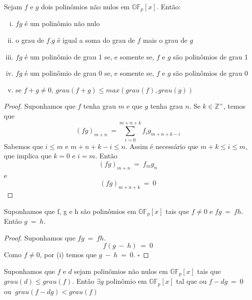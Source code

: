 
\begin{theorem}
Sejam $f$ e $g$ dois polinômios não nulos em $\mathbb{GF}_p[x]$. Então:
  \begin{enumerate}[(i)]
     \item $fg$ é um polinômio não nulo
     \item o grau de $f.g$ é igual a soma do grau de $f$ mais o grau de $g$
     \item $fg$ é um polinômio de grau 1 se, e somente se, $f$ e $g$ são polinômios de grau 1
     \item $fg$ é um polinômio de grau 0 se, e somente se, $f$ e $g$ são polinômios de grau 0
     \item se $f+g \neq 0$, $grau(f+g) \leq max (grau(f), grau(g))$
  \end{enumerate}
\end{theorem}

\begin{proof}
Suponhamos que $f$ tenha grau $m$ e que $g$ tenha grau $n$. Se $k \in \mathbb{Z}^+$, temos que
$$
(fg)_{m+n}\ = \displaystyle\sum_{i=0}^{m+n+k} f_i g_{m+n+k-i}
$$
Sabemos que $i \leq m$ e $m+n+k-i \leq n$. Assim é necessário que $m+k \leq i \leq m$, que implica que $k=0$ e $i=m$. Então
$$
(fg)_{m+n}\ =\ f_m g_n
$$
e
$$
(fg)_{m+n+k}\ =\ 0
$$
\end{proof}

\begin{corollary} Suponhamos que f, g e h são polinômios em $\mathbb{GF}_p[x]$ tais que $f \neq 0$ e $fg\ =\ fh$. Então $g\ =\ h$.
\end{corollary}

\begin{proof} Suponhamos que $fg\ =\ fh$.
$$
f(g\ -\ h)\ =\ 0
$$
Como $f \neq 0$, por (i) temos que $g\ -\ h\ =\ 0$. $\square$
\end{proof}

\begin{lemma} \label{lema1} Suponhamos que $f$ e $d$ sejam polinômios não nulos em $\mathbb{GF}_p[x]$ tais que $grau(d) \leq grau(f)$. Então $\exists g$ polinômio em $\mathbb{GF}_p[x]$ tal que ou $f-dg\ =\ 0$ ou  $\ grau(f-dg) < grau(f)$
\end{lemma}

